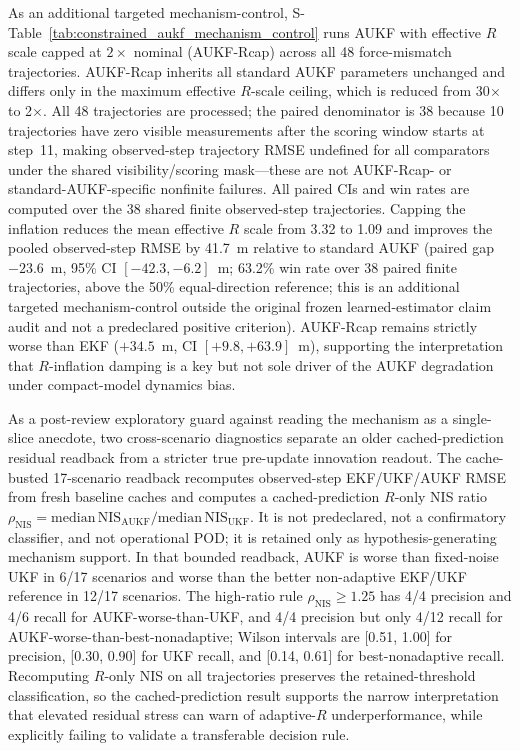 \documentclass{article}
\begin{document}


As an additional targeted mechanism-control, S-Table~\ref{tab:constrained_aukf_mechanism_control} runs AUKF with effective \(R\) scale capped at \(2\times\) nominal (AUKF-Rcap) across all 48 force-mismatch trajectories. AUKF-Rcap inherits all standard AUKF parameters unchanged and differs only in the maximum effective \(R\)-scale ceiling, which is reduced from 30$\times$ to 2$\times$. All 48 trajectories are processed; the paired denominator is 38 because 10 trajectories have zero visible measurements after the scoring window starts at step~11, making observed-step trajectory RMSE undefined for all comparators under the shared visibility/scoring mask---these are not AUKF-Rcap- or standard-AUKF-specific nonfinite failures. All paired CIs and win rates are computed over the 38 shared finite observed-step trajectories. Capping the inflation reduces the mean effective \(R\) scale from 3.32 to 1.09 and improves the pooled observed-step RMSE by 41.7~m relative to standard AUKF (paired gap $-23.6$~m, 95\% CI $[-42.3, -6.2]$~m; 63.2\% win rate over 38 paired finite trajectories, above the 50\% equal-direction reference; this is an additional targeted mechanism-control outside the original frozen learned-estimator claim audit and not a predeclared positive criterion). AUKF-Rcap remains strictly worse than EKF ($+34.5$~m, CI $[+9.8, +63.9]$~m), supporting the interpretation that \(R\)-inflation damping is a key but not sole driver of the AUKF degradation under compact-model dynamics bias.

As a post-review exploratory guard against reading the mechanism as a single-slice anecdote, two cross-scenario diagnostics separate an older cached-prediction residual readback from a stricter true pre-update innovation readout. The cache-busted 17-scenario readback recomputes observed-step EKF/UKF/AUKF RMSE from fresh baseline caches and computes a cached-prediction \(R\)-only NIS ratio \(\rho_{\mathrm{NIS}}=\mathrm{median\,NIS}_{\mathrm{AUKF}}/\mathrm{median\,NIS}_{\mathrm{UKF}}\). It is not predeclared, not a confirmatory classifier, and not operational POD; it is retained only as hypothesis-generating mechanism support. In that bounded readback, AUKF is worse than fixed-noise UKF in 6/17 scenarios and worse than the better non-adaptive EKF/UKF reference in 12/17 scenarios. The high-ratio rule \(\rho_{\mathrm{NIS}}\geq1.25\) has 4/4 precision and 4/6 recall for AUKF-worse-than-UKF, and 4/4 precision but only 4/12 recall for AUKF-worse-than-best-nonadaptive; Wilson intervals are [0.51, 1.00] for precision, [0.30, 0.90] for UKF recall, and [0.14, 0.61] for best-nonadaptive recall. Recomputing \(R\)-only NIS on all trajectories preserves the retained-threshold classification, so the cached-prediction result supports the narrow interpretation that elevated residual stress can warn of adaptive-\(R\) underperformance, while explicitly failing to validate a transferable decision rule.
\end{document}
